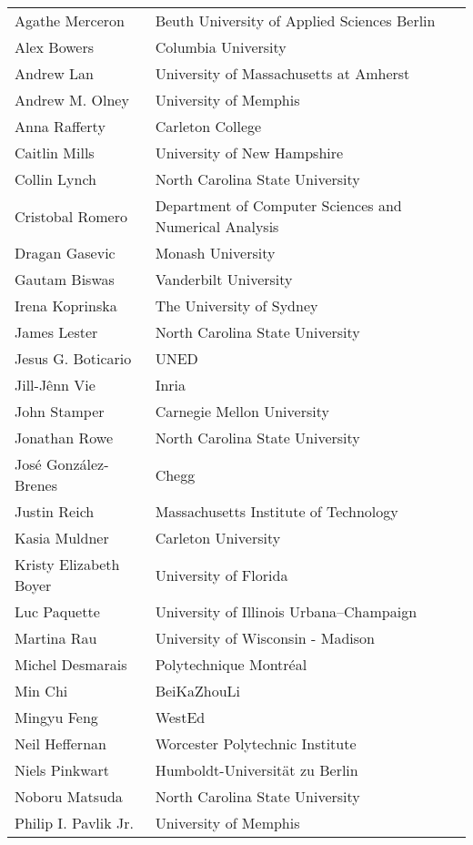 \documentclass[letterpaper,11pt,oneside]{book} %
\begin{document}
\begin{longtable}[]{@{}ll@{}}
& \\
\endhead
Agathe Merceron & Beuth University of Applied Sciences Berlin \\
Alex Bowers & Columbia University \\
Andrew Lan & University of Massachusetts at Amherst \\
Andrew M. Olney & University of Memphis \\
Anna Rafferty & Carleton College \\
Caitlin Mills & University of New Hampshire \\
Collin Lynch & North Carolina State University \\
Cristobal Romero & Department of Computer Sciences and Numerical
Analysis \\
Dragan Gasevic & Monash University \\
Gautam Biswas & Vanderbilt University \\
Irena Koprinska & The University of Sydney \\
James Lester & North Carolina State University \\
Jesus G. Boticario & UNED \\
Jill-Jênn Vie & Inria \\
John Stamper & Carnegie Mellon University \\
Jonathan Rowe & North Carolina State University \\
José González-Brenes & Chegg \\
Justin Reich & Massachusetts Institute of Technology \\
Kasia Muldner & Carleton University \\
Kristy Elizabeth Boyer & University of Florida \\
Luc Paquette & University of Illinois Urbana--Champaign \\
Martina Rau & University of Wisconsin - Madison \\
Michel Desmarais & Polytechnique Montréal \\
Min Chi & BeiKaZhouLi \\
Mingyu Feng & WestEd \\
Neil Heffernan & Worcester Polytechnic Institute \\
Niels Pinkwart & Humboldt-Universität zu Berlin \\
Noboru Matsuda & North Carolina State University \\
Philip I. Pavlik Jr. & University of Memphis \\

\end{longtable}
\end{document}
